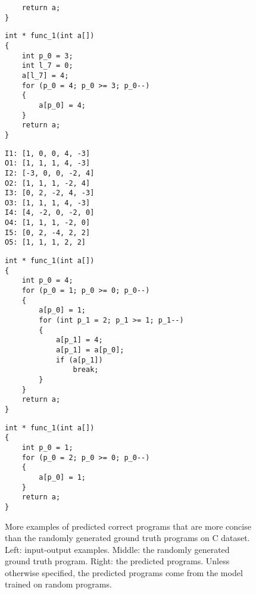 \begin{figure}
\begin{minipage}{0.40\textwidth}
\begin{verbatim}
    return a;
}
\end{verbatim}
\end{minipage}
\begin{minipage}{0.33\textwidth}
\begin{verbatim}
int * func_1(int a[])
{
    int p_0 = 3;
    int l_7 = 0;
    a[l_7] = 4;
    for (p_0 = 4; p_0 >= 3; p_0--)
    {
        a[p_0] = 4;
    }
    return a;
}
\end{verbatim}
\end{minipage}
\par\vspace{3mm}
\begin{minipage}{0.25\textwidth}
\begin{verbatim}
I1: [1, 0, 0, 4, -3]
O1: [1, 1, 1, 4, -3]
I2: [-3, 0, 0, -2, 4]
O2: [1, 1, 1, -2, 4]
I3: [0, 2, -2, 4, -3]
O3: [1, 1, 1, 4, -3]
I4: [4, -2, 0, -2, 0]
O4: [1, 1, 1, -2, 0]
I5: [0, 2, -4, 2, 2]
O5: [1, 1, 1, 2, 2]
\end{verbatim}
\end{minipage}
\begin{minipage}{0.40\textwidth}
\begin{verbatim}
int * func_1(int a[])
{
    int p_0 = 4;
    for (p_0 = 1; p_0 >= 0; p_0--)
    {
        a[p_0] = 1;
        for (int p_1 = 2; p_1 >= 1; p_1--)
        {
            a[p_1] = 4;
            a[p_1] = a[p_0];
            if (a[p_1])
                break;
        }
    }
    return a;
}
\end{verbatim}
\end{minipage}
\begin{minipage}{0.33\textwidth}
\begin{verbatim}
int * func_1(int a[])
{
    int p_0 = 1;
    for (p_0 = 2; p_0 >= 0; p_0--)
    {
        a[p_0] = 1;
    }
    return a;
}
\end{verbatim}
\end{minipage}
\caption{\small More examples of predicted correct programs that are more concise than the randomly generated ground truth programs on C dataset. Left: input-output examples. Middle: the randomly generated ground truth program. Right: the predicted programs. Unless otherwise specified, the predicted programs come from the model trained on random programs.}
\label{fig:ex-retrain-c}
\vspace{-0.15in}
\end{figure}

